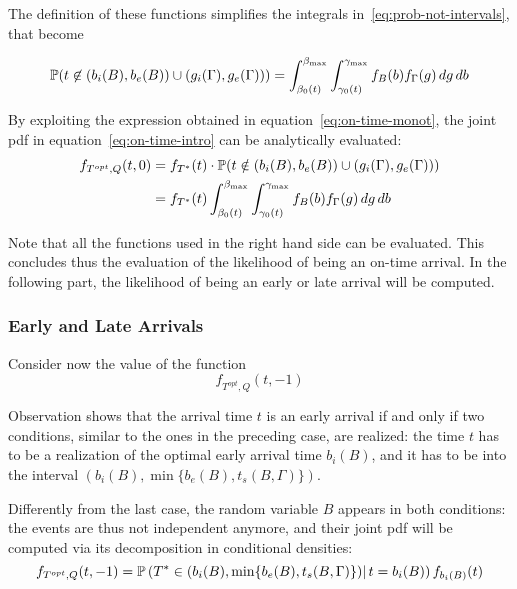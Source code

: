 The definition of these functions simplifies the integrals in~\eqref{eq:prob-not-intervals}, that become

\begin{equation}
  \label{eq:on-time-monot}
  \mathbb{P}( t \not\in (b_i(B), b_e(B)) \cup (g_i(\Gamma), g_e(\Gamma))) = \int_{\beta_0(t)}^{\beta_{\text{max}}}\int_{\gamma_0(t)}^{\gamma_{\text{max}}}f_B(b)f_\Gamma(g)\, dg\, db
\end{equation}

By exploiting the expression obtained in equation~\eqref{eq:on-time-monot},
the joint pdf in equation~\eqref{eq:on-time-intro} can be analytically evaluated:
\begin{equation}
  \label{eq:on-time-final}
  \begin{split}
    f_{T^{opt}, Q}(t, 0) & = f_{T^*}(t) \cdot \mathbb{P}(t \notin (b_i(B), b_e(B)) \cup (g_i(\Gamma), g_e(\Gamma))) \\
    & = f_{T^*}(t)\int_{\beta_0(t)}^{\beta_{\text{max}}}\int_{\gamma_0(t)}^{\gamma_{\text{max}}}f_B(b)f_\Gamma(g)\, dg\, db
  \end{split}
\end{equation}

Note that all the functions used in the right hand side can be evaluated.
This concludes thus the evaluation of the likelihood of being an on-time arrival.
In the following part, the likelihood of being an early or late arrival will be computed.

\subsubsection{Early and Late Arrivals}

Consider now the value of the function
\begin{equation*}
  f_{T^{opt}, Q}(t, -1)
\end{equation*}

Observation shows that the arrival time \(t\) is an early arrival if and only if two conditions,
similar to the ones in the preceding case,
are realized:
the time \(t\) has to be a realization of the optimal early arrival time \(b_i(B)\),
and it has to be into the interval \((b_i(B), \min\{b_e(B), t_s(B, \Gamma)\})\).

Differently from the last case, the random variable \(B\) appears in both conditions:
the events are thus not independent anymore,
and their joint pdf will be computed via its decomposition in conditional densities:
\begin{equation}
  \label{eq:late-joint-decomp}
  f_{T^{opt}, Q}(t, -1) = \mathbb{P}\left(T^* \in (b_i(B), \min\{b_e(B), t_s(B, \Gamma)\})|\, t = b_i(B)\right) f_{b_i(B)}(t)
\end{equation}


